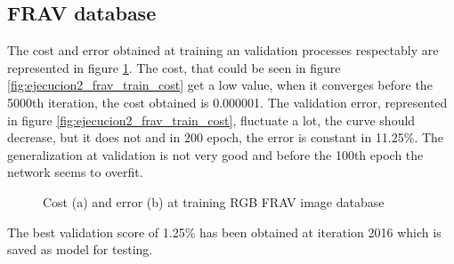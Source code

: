 \subsection{FRAV database}
The cost and error obtained at training an validation processes respectably are represented in figure \ref{fig:ejecucion2_frav_train}. The cost, that could be seen in figure \ref{fig:ejecucion2_frav_train_cost} get a low value, when it converges before the 5000th iteration, the cost obtained is 0.000001. The validation error, represented in figure \ref{fig:ejecucion2_frav_train_cost}, fluctuate a lot, the curve should decrease, but it does not and in 200 epoch, the error is constant in 11.25\%. The generalization at validation is not very good and before the 100th epoch the network seems to overfit.\\
\begin{figure}[htb]
\centering
\caption{Cost (a) and error (b) at training RGB FRAV image database}
\label{fig:ejecucion2_frav_train}
\end{figure}

The best validation score of 1.25\% has been obtained at iteration 2016 which is saved as model for testing.\\

